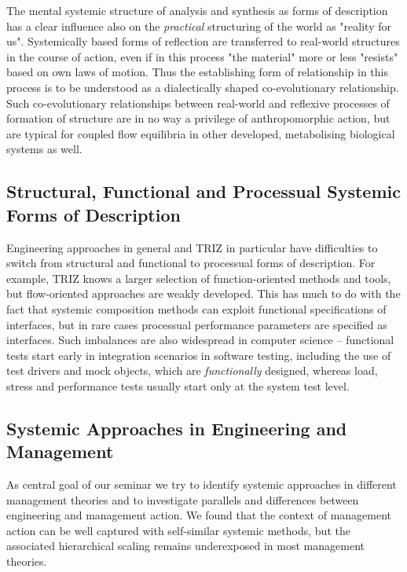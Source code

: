 \documentclass[11pt,a4paper]{article}
\begin{document}
The mental systemic structure of analysis and synthesis as forms of
description has a clear influence also on the \emph{practical} structuring of
the world as "reality for us". Systemically based forms of reflection are
transferred to real-world structures in the course of action, even if in this
process "the material" more or less "resists" based on own laws of motion.
Thus the establishing form of relationship in this process is to be understood
as a dialectically shaped co-evolutionary relationship. Such co-evolutionary
relationships between real-world and reflexive processes of formation of
structure are in no way a privilege of anthropomorphic action, but are typical
for coupled flow equilibria in other developed, metabolising biological
systems as well.

\subsection{Structural, Functional and Processual Systemic Forms of
  Description} 

Engineering approaches in general and TRIZ in particular have difficulties to
switch from structural and functional to processual forms of description. For
example, TRIZ knows a larger selection of function-oriented methods and tools,
but flow-oriented approaches are weakly developed. This has much to do with
the fact that systemic composition methods can exploit functional
specifications of interfaces, but in rare cases processual performance
parameters are specified as interfaces. Such imbalances are also widespread in
computer science -- functional tests start early in integration scenarios in
software testing, including the use of test drivers and mock objects, which
are \emph{functionally} designed, whereas load, stress and performance tests
usually start only at the system test level.
\enlargethispage{1em}

\subsection{Systemic Approaches in Engineering and Management}

As central goal of our seminar we try to identify systemic approaches in
different management theories and to investigate parallels and differences
between engineering and management action. We found that the context of
management action can be well captured with self-similar systemic methods, but
the associated hierarchical scaling remains underexposed in most management
theories.
\end{document}
